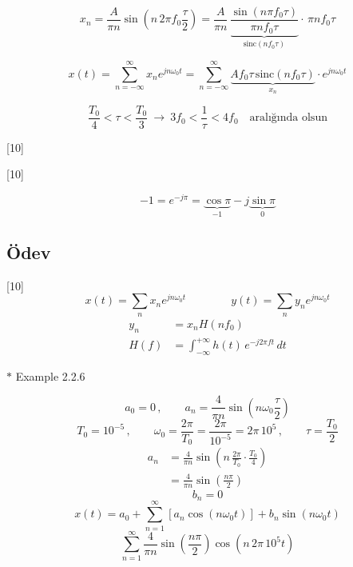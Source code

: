 \documentclass[11pt,a4paper]{article}
\begin{document}
\[ x_n=\frac{A}{\pi n}\sin\left(n\,2\pi f_0\frac{\tau}{2}\right)=\frac{A}{\pi n}\,\underbrace{\frac{\sin(n\pi f_0\tau)}{\pi n f_0\tau}}_{\mathrm{sinc}(nf_0\tau)}\cdot\,\pi n f_0\tau \]


\[ x(t)=\sum_{n=-\infty}^{\infty}x_n e^{jn\omega_0 t}=\sum_{n=-\infty}^{\infty}\underbrace{Af_0\tau\,\mathrm{sinc}(nf_0\tau)}_{x_n}\cdot e^{jn\omega_0 t} \]

\[ \frac{T_0}{4}<\tau<\frac{T_0}{3}\ \rightarrow\ 3f_0<\frac{1}{\tau}<4f_0 \quad\text{aralığında olsun} \]

[10]

[10]

\[ -1=e^{-j\pi}=\underbrace{\cos\pi}_{-1}-j\underbrace{\sin\pi}_{0} \]

\subsection{Ödev}
[10]
\[ x(t)=\sum_n x_n e^{jn\omega_0 t} \qquad\qquad y(t)=\sum_n y_n e^{jn\omega_0 t} \]
\begin{align*}
y_n &= x_n H(nf_0) \\
H(f) &= \int_{-\infty}^{+\infty}h(t)\,e^{-j2\pi f t}\,dt
\end{align*}

$\ast$ Example 2.2.6


\[ a_0=0\,,\qquad a_n=\frac{4}{\pi n}\sin\left(n\omega_0\frac{\tau}{2}\right) \]
\[ T_0=10^{-5}\,,\qquad \omega_0=\frac{2\pi}{T_0}=\frac{2\pi}{10^{-5}}=2\pi\,10^5\,,\qquad \tau=\frac{T_0}{2} \]
\begin{align*}
a_n &= \frac{4}{\pi n}\sin\left(n\,\frac{2\pi}{T_0}\cdot\frac{T_0}{4}\right) \\
&= \frac{4}{\pi n}\sin\left(\frac{n\pi}{2}\right)
\end{align*}
\[ b_n=0 \]
\[ x(t)=a_0+\sum_{n=1}^{\infty}\left[a_n\cos(n\omega_0 t)\right]+b_n\sin(n\omega_0 t) \]
\[ \sum_{n=1}^{\infty}\frac{4}{\pi n}\sin\left(\frac{n\pi}{2}\right)\cos\left(n\,2\pi\,10^5 t\right) \]
\end{document}
